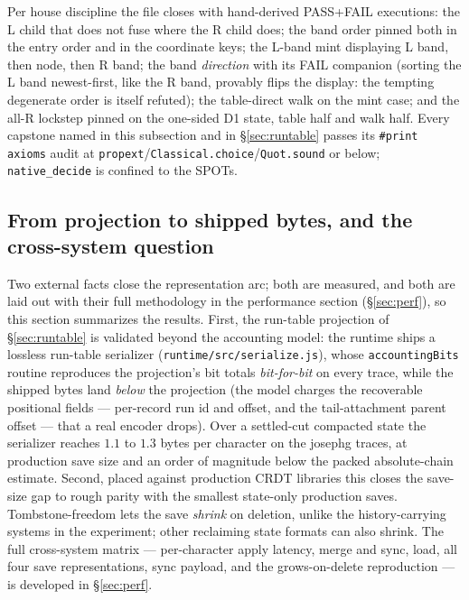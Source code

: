 \documentclass[11pt]{article}
\newcommand{\lean}[1]{\texttt{#1}}
\newcommand{\code}[1]{\texttt{#1}}
\begin{document}
Per house discipline the file closes with hand-derived PASS+FAIL
executions: the L child that does not fuse where the R child does; the
band order pinned both in the entry order and in the coordinate keys;
the L-band mint displaying L band, then node, then R band; the band
\emph{direction} with its FAIL companion (sorting the L band
newest-first, like the R band, provably flips the display: the tempting
degenerate order is itself refuted); the table-direct walk on the mint
case; and the all-R lockstep pinned on the one-sided D1 state, table
half and walk half. Every capstone named in this subsection and in
\S\ref{sec:runtable} passes its \code{\#print axioms} audit at
\code{propext}/\code{Classical.choice}/\code{Quot.sound} or below;
\code{native\_decide} is confined to the SPOTs.

\subsection{From projection to shipped bytes, and the cross-system question}
\label{sec:crossbench}

Two external facts close the representation arc; both are measured, and
both are laid out with their full methodology in the performance section
(\S\ref{sec:perf}), so this section summarizes the results. First, the
run-table projection of \S\ref{sec:runtable} is validated beyond the
accounting model: the runtime ships a lossless run-table serializer
(\code{runtime/src/serialize.js}), whose \lean{accountingBits} routine
reproduces the projection's bit totals \emph{bit-for-bit} on every trace,
while the shipped bytes land \emph{below} the projection (the model
charges the recoverable positional fields --- per-record run id and
offset, and the tail-attachment parent offset --- that a real encoder
drops). Over a settled-cut compacted state the serializer reaches $1.1$
to $1.3$ bytes per character on the josephg traces, at production save
size and an order of magnitude below the packed absolute-chain estimate.
Second, placed against production CRDT libraries this closes the save-size
gap to rough parity with the smallest state-only production saves.
Tombstone-freedom lets the save \emph{shrink} on deletion, unlike the
history-carrying systems in the experiment; other reclaiming state formats
can also shrink. The full cross-system matrix --- per-character apply latency, merge
and sync, load, all four save representations, sync payload, and the
grows-on-delete reproduction --- is developed in \S\ref{sec:perf}.
\end{document}
